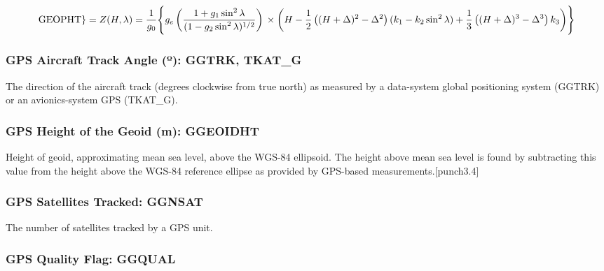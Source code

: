 \documentclass[
  english,
]{book}
\begin{document}
\begin{equation}
\mathrm{GEOPHT\}}=Z(H,\lambda)=\frac{1}{g_{0}}\Biggl\{ g_{e}\left(\frac{1+g_{1}\sin^{2}\lambda}{(1-g_{2}\sin^{2}\lambda)^{1/2}}\right) \notag \\   
\times \left(H-\frac{1}{2}\left((H+\Delta)^{2}-\Delta^{2}\right)(k_{1}-k_{2}\sin^{2}\lambda)+\frac{1}{3}\left((H+\Delta)^{3}-\Delta^{3}\right)k_{3}\right)\Biggr\}  
\label{eq:GEOPHT}
\end{equation}

\hypertarget{ggtrk}{%
\subsubsection*{\texorpdfstring{GPS Aircraft Track Angle ({º}): GGTRK, TKAT\_G}{GPS Aircraft Track Angle (º): GGTRK, TKAT\_G}}\label{ggtrk}}

The direction of the aircraft track (degrees clockwise from true north) as measured by a data-system global positioning system (GGTRK) or an avionics-system GPS (TKAT\_G).

\hypertarget{ggeoidht}{%
\subsubsection*{GPS Height of the Geoid (m): GGEOIDHT}\label{ggeoidht}}

Height of geoid, approximating mean sea level, above the WGS-84 ellipsoid. The height above mean sea level is found by subtracting this value from the height above the WGS-84 reference ellipse as provided by GPS-based measurements.\protect\hypertarget{punch3.4}{}{{[}punch3.4{]}}

\hypertarget{ggnsat}{%
\subsubsection*{GPS Satellites Tracked: GGNSAT}\label{ggnsat}}

The number of satellites tracked by a GPS unit.

\hypertarget{ggqual}{%
\subsubsection*{GPS Quality Flag: GGQUAL}\label{ggqual}}
\end{document}
